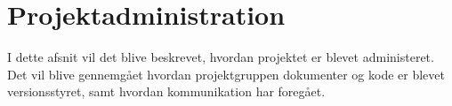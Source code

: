 \section{Projektadministration}

I dette afsnit vil det blive beskrevet, hvordan projektet er blevet administeret. Det vil blive gennemgået hvordan projektgruppen dokumenter og kode er blevet versionsstyret, samt hvordan kommunikation har foregået.

